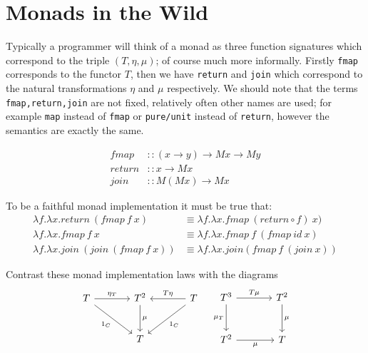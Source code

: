 \section{Monads in the Wild}
Typically a programmer will think of a monad as three function signatures
which correspond to the triple $(T,\eta,\mu)$;
of course much more informally.
Firstly \texttt{fmap} corresponds to the functor $T$,
then we have \texttt{return} and \texttt{join} which correspond to
the natural transformations $\eta$ and $\mu$ respectively.
We should note that the terms \texttt{fmap,return,join}
are not fixed, relatively often other names are used;
for example \texttt{map} instead of \texttt{fmap}
or \texttt{pure/unit} instead of \texttt{return},
however the semantics are exactly the same.

\begin{equation}
  \begin{split}
    fmap   &:: (x \rightarrow y) \rightarrow M x \rightarrow M y \\
    return &:: x \rightarrow M x                                 \\
    join   &:: M (M x) \rightarrow M x
  \end{split}
\end{equation}

To be a faithful monad implementation it must be true that:
\begin{equation}
  \begin{split}
      \lambda f.\lambda x.return\ (fmap\ f\ x)
      &\equiv
      \lambda f.\lambda x.fmap\ (return \circ f)\ x)
      \\
      \lambda f.\lambda x.fmap\ f\ x
      &\equiv
      \lambda f.\lambda x.fmap\ f\ (fmap\ id\ x)
      \\
      \lambda f.\lambda x.join\ (join\ (fmap\ f\ x))
      &\equiv
      \lambda f.\lambda x.join(fmap\ f\ (join\ x))
  \end{split}
\end{equation}

Contrast these monad implementation laws with the diagrams
\begin{equation}
    \begin{tikzcd}[sep=large]
        T \rar{\eta_T} \drar[swap]{1_{C}} & T^2 \dar{\mu} & \lar[swap]{T\eta} \dlar{1_{C}} T \\
                                           & T            &
    \end{tikzcd}
    \quad
    \begin{tikzcd}[sep=large]
        T^3 \rar{T\mu} \dar[swap]{\mu_T} & T^2 \dar{\mu} \\
        T^2 \rar[swap]{\mu}                    & T
    \end{tikzcd}
\end{equation}

